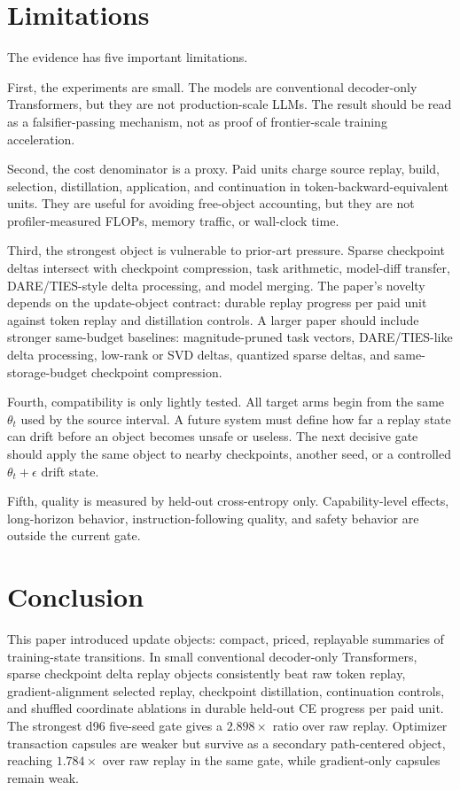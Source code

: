 \documentclass{article}
\begin{document}
\section{Limitations}

The evidence has five important limitations.

First, the experiments are small. The models are conventional decoder-only
Transformers, but they are not production-scale LLMs. The result should be
read as a falsifier-passing mechanism, not as proof of frontier-scale training
acceleration.

Second, the cost denominator is a proxy. Paid units charge source replay,
build, selection, distillation, application, and continuation in
token-backward-equivalent units. They are useful for avoiding free-object
accounting, but they are not profiler-measured FLOPs, memory traffic, or
wall-clock time.

Third, the strongest object is vulnerable to prior-art pressure. Sparse
checkpoint deltas intersect with checkpoint compression, task arithmetic,
model-diff transfer, DARE/TIES-style delta processing, and model merging. The
paper's novelty depends on the update-object contract: durable replay progress
per paid unit against token replay and distillation controls. A larger paper
should include stronger same-budget baselines: magnitude-pruned task vectors,
DARE/TIES-like delta processing, low-rank or SVD deltas, quantized sparse
deltas, and same-storage-budget checkpoint compression.

Fourth, compatibility is only lightly tested. All target arms begin from the
same $\theta_t$ used by the source interval. A future system must define how
far a replay state can drift before an object becomes unsafe or useless. The
next decisive gate should apply the same object to nearby checkpoints, another
seed, or a controlled $\theta_t+\epsilon$ drift state.

Fifth, quality is measured by held-out cross-entropy only. Capability-level
effects, long-horizon behavior, instruction-following quality, and safety
behavior are outside the current gate.

\section{Conclusion}

This paper introduced update objects: compact, priced, replayable summaries of
training-state transitions. In small conventional decoder-only Transformers,
sparse checkpoint delta replay objects consistently beat raw token replay,
gradient-alignment selected replay, checkpoint distillation, continuation
controls, and shuffled coordinate ablations in durable held-out CE progress per
paid unit. The strongest d96 five-seed gate gives a $2.898\times$ ratio over
raw replay. Optimizer transaction capsules are weaker but survive as a
secondary path-centered object, reaching $1.784\times$ over raw replay in the
same gate, while gradient-only capsules remain weak.
\end{document}

